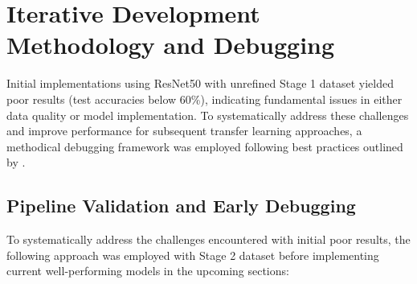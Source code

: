 \documentclass[a4paper,12pt]{report}
\begin{document}


\section{Iterative Development Methodology and Debugging}

Initial implementations using ResNet50 with unrefined Stage 1 dataset yielded poor results (test accuracies below 60\%), indicating fundamental issues in either data quality or model implementation. To systematically address these challenges and improve performance for subsequent transfer learning approaches, a methodical debugging framework was employed following best practices outlined by \citep{karpathy2019recipe}.

\subsection{Pipeline Validation and Early Debugging}

To systematically address the challenges encountered with initial poor results, the following approach was employed with Stage 2 dataset before implementing current well-performing models in the upcoming sections:
\end{document}
